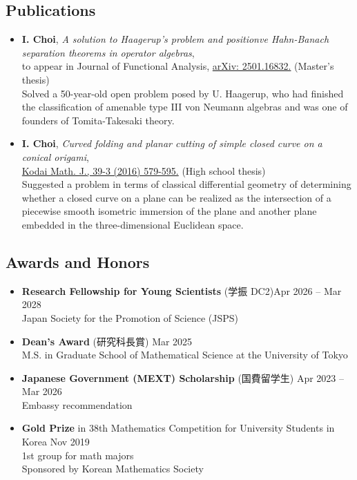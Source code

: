 \documentclass[11pt,a4paper]{article}
\begin{document}
\subsection*{Publications}
\begin{itemize}
\item
	\textbf{I. Choi},
	\emph{A solution to Haagerup's problem and positionve Hahn-Banach separation theorems in operator algebras},\\
	to appear in Journal of Functional Analysis, \href{https://arxiv.org/abs/2501.16832}{arXiv: 2501.16832.} (Master's thesis)\\[4pt]
	\faArrowRight\quad
	Solved a 50-year-old open problem posed by U. Haagerup, who had finished the classification of amenable type III von Neumann algebras and was one of founders of Tomita-Takesaki theory.
\item
	\textbf{I. Choi},
	\emph{Curved folding and planar cutting of simple closed curve on a conical origami},\\
	\href{https://projecteuclid.org/journals/kodai-mathematical-journal/volume-39/issue-3/Curved-folding-and-planar-cutting-of-simple-closed-curve-on/10.2996/kmj/1478073774.full}{Kodai Math. J., 39-3 (2016) 579-595.} (High school thesis)\\[4pt]
	\faArrowRight\quad
	Suggested a problem in terms of classical differential geometry of determining whether a closed curve on a plane can be realized as the intersection of a piecewise smooth isometric immersion of the plane and another plane embedded in the three-dimensional Euclidean space.
\end{itemize}



\subsection*{Awards and Honors}
\begin{itemize}
\item
	\textbf{Research Fellowship for Young Scientists} (学振 DC2)\hfill{\small Apr 2026 -- Mar 2028}\\
	Japan Society for the Promotion of Science (JSPS)
\item
	\textbf{Dean's Award} (研究科長賞)
	\hfill{\small Mar 2025}\\
	M.S. in Graduate School of Mathematical Science at the University of Tokyo
\item
	\textbf{Japanese Government (MEXT) Scholarship} (国費留学生)
	\hfill{\small Apr 2023 -- Mar 2026}\\
	Embassy recommendation
\item
	\textbf{Gold Prize} in 38th Mathematics Competition for University Students in Korea
	\hfill{\small Nov 2019}\\
	1st group for math majors\\
	Sponsored by Korean Mathematics Society
\end{itemize}
\end{document}

